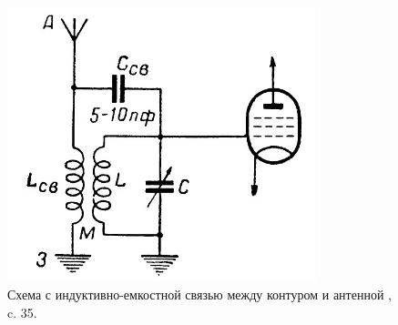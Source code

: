 \begin{figure}[H] \centering
  \includegraphics[width=0.8\textwidth]{./content/Siforov_20.jpg}
  \caption{Схема с индуктивно-емкостной связью между контуром и антенной  \cite{Siforov}, c. 35. } \label{p:Siforov_20}
\end{figure}



\inputminted[fontsize=\small, linenos, breaklines, numbersep=2mm, xleftmargin=5mm]{matlab}{./content/VhCerkets3_1.m}

